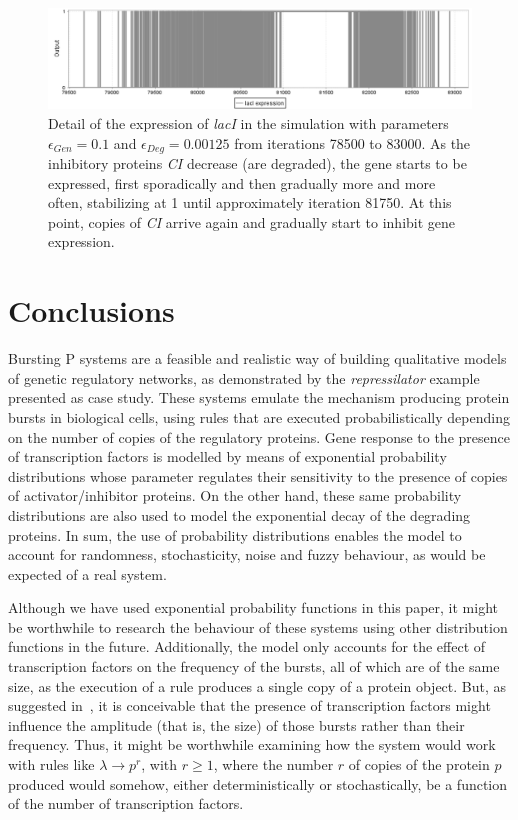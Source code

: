 \documentclass[runningheads,a4paper]{llncs}
\begin{document}
\begin{figure}
\begin{center}
\includegraphics[width=1\textwidth]{detail}
\caption{Detail of the expression of \textit{lacI} in the simulation with parameters $\epsilon_{Gen} = 0.1$ and $\epsilon_{Deg} = 0.00125$ from iterations 78500 to 83000. As the inhibitory proteins \textit{CI} decrease (are degraded), the gene starts to be expressed, first sporadically and then gradually more and more often, stabilizing at 1 until approximately iteration 81750. At this point, copies of \textit{CI} arrive again and gradually start to inhibit gene expression.}
\label{f:detail}
\end{center}
\end{figure}
%
\section{Conclusions}
Bursting P systems are a feasible and realistic way of building qualitative models of genetic regulatory networks, as demonstrated by the \textit{repressilator} example presented as case study. These systems emulate the mechanism producing protein bursts in biological cells, using rules that are executed probabilistically depending on the number of copies of the regulatory proteins. Gene response to the presence of transcription factors is modelled by means of exponential probability distributions whose parameter regulates their sensitivity to the presence of copies of activator/inhibitor proteins. On the other hand, these same probability distributions are also used to model the exponential decay of the degrading proteins. In sum, the use of probability distributions enables the model to account for randomness, stochasticity, noise and fuzzy behaviour, as would be expected of a real system.


Although we have used exponential probability functions in this paper, it might be worthwhile to research the behaviour of these systems using other distribution functions in the future. Additionally, the model only accounts for the effect of transcription factors on the frequency of the bursts, all of which are of the same size, as the execution of a rule produces a single copy of a protein object. But, as suggested in~\cite{Raj2006}, it is conceivable that the presence of transcription factors might influence the amplitude (that is, the size) of those bursts rather than their frequency. Thus, it might be worthwhile examining how the system would work with rules like $\lambda \rightarrow p^r$, with $r \geq1$, where the number $r$ of copies of the protein $p$ produced would somehow, either deterministically or stochastically, be a function of the number of transcription factors. 

{}

\end{document}
